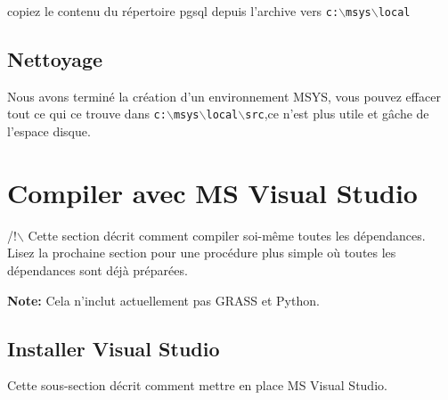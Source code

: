 copiez le contenu du répertoire pgsql depuis l'archive vers \texttt{c:$\backslash$msys$\backslash$local}


\subsection{Nettoyage}
Nous avons terminé la création d'un environnement MSYS, vous pouvez effacer tout ce qui ce trouve dans \texttt{c:$\backslash$msys$\backslash$local$\backslash$src},ce n'est plus utile et gâche de l'espace disque.

% 

\section{Compiler avec MS Visual Studio}
/!$\backslash$ Cette section décrit comment compiler soi-même toutes les dépendances. Lisez la prochaine section pour une procédure plus simple où toutes les dépendances sont déjà préparées.

\textbf{Note:} Cela n'inclut actuellement pas GRASS et Python.


\subsection{Installer Visual Studio}
Cette sous-section décrit comment mettre en place MS Visual Studio. 

